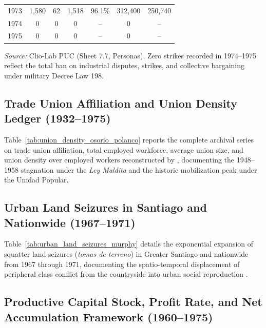 \begin{table}[htbp]
\begin{tabular}{lcccccc}
1973 & 1,580 & 62 & 1,518 & 96.1\% & 312,400 & 250,740 \\
1974 & 0 & 0 & 0 & -- & 0 & -- \\
1975 & 0 & 0 & 0 & -- & 0 & -- \\
\bottomrule
\end{tabular}
\begin{minipage}{\textwidth}
\vspace{0.3em}
\footnotesize
\textit{Source:} Clio-Lab PUC (Sheet 7.7, Personas). Zero strikes recorded in 1974--1975 reflect the total ban on industrial disputes, strikes, and collective bargaining under military Decree Law 198.
\end{minipage}
\end{table}

\subsection{Trade Union Affiliation and Union Density Ledger (1932--1975)}
\label{app:union_density_ledger}

Table~\ref{tab:union_density_osorio_polanco} reports the complete archival series on trade union affiliation, total employed workforce, average union size, and union density over employed workers reconstructed by \citet{OsorioPolanco2021}, documenting the 1948--1958 stagnation under the \textit{Ley Maldita} and the historic mobilization peak under the Unidad Popular.



\subsection{Urban Land Seizures in Santiago and Nationwide (1967--1971)}
\label{app:land_seizures_ledger}

Table~\ref{tab:urban_land_seizures_murphy} details the exponential expansion of squatter land seizures (\textit{tomas de terreno}) in Greater Santiago and nationwide from 1967 through 1971, documenting the spatio-temporal displacement of peripheral class conflict from the countryside into urban social reproduction \citep{Murphy2015}.



\subsection{Productive Capital Stock, Profit Rate, and Net Accumulation Framework (1960--1975)}
\label{app:profit_accumulation_ledger}

